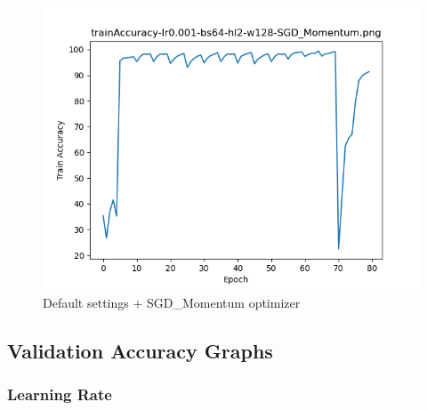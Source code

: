 \documentclass{article}[12pt]
\begin{document}
        \begin{figure}[H]
        \includegraphics[width=\linewidth]{testsResults/trainAccuracy/trainAccuracy-lr0.001-bs64-hl2-w128-SGD_Momentum.png}
        \caption{Default settings + SGD\_Momentum optimizer}
        \endminipage
    \end{figure}

\subsection{Validation Accuracy Graphs}


\subsubsection{Learning Rate}
\end{document}
